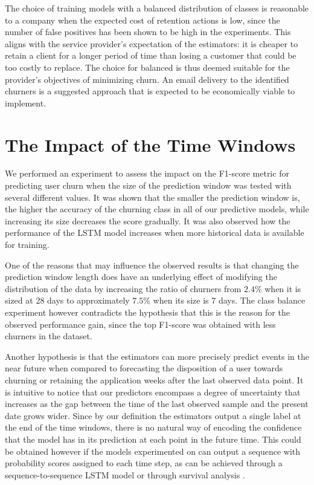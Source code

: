 \documentclass{kththesis}
\begin{document}
The choice of training models with a balanced distribution of classes is reasonable to a company when the expected cost of retention actions is low, since the number of false positives has been shown to be high in the experiments. This aligns with the service provider's expectation of the estimators: it is cheaper to retain a client for a longer period of time than losing a customer that could be too costly to replace. The choice for balanced is thus deemed suitable for the provider's objectives of minimizing churn. An email delivery to the identified churners is a suggested approach that is expected to be economically viable to implement.

\section{The Impact of the Time Windows}
\label{sec:dis_time_windows}

We performed an experiment to assess the impact on the F1-score metric for predicting user churn when the size of the prediction window was tested with several different values. It was shown that the smaller the prediction window is, the higher the accuracy of the churning class in all of our predictive models, while increasing its size decreases the score gradually. It was also observed how the performance of the LSTM model increases when more historical data is available for training.

One of the reasons that may influence the observed results is that changing the prediction window length does have an underlying effect of modifying the distribution of the data by increasing the ratio of churners from $2.4\%$ when it is sized at 28 days to approximately $7.5\%$ when its size is 7 days. The class balance experiment however contradicts the hypothesis that this is the reason for the observed performance gain, since the top F1-score was obtained with less churners in the dataset.

Another hypothesis is that the estimators can more precisely predict events in the near future when compared to forecasting the disposition of a user towards churning or retaining the application weeks after the last observed data point. It is intuitive to notice that our predictors encompass a degree of uncertainty that increases as the gap between the time of the last observed sample and the present date grows wider. Since by our definition the estimators output a single label at the end of the time windows, there is no natural way of encoding the confidence that the model has in its prediction at each point in the future time. This could be obtained however if the models experimented on can output a sequence with probability scores assigned to each time step, as can be achieved through a sequence-to-sequence LSTM \citep{cho2014learning} model or through survival analysis \citep{ibrahim2005bayesian}.
\end{document}

